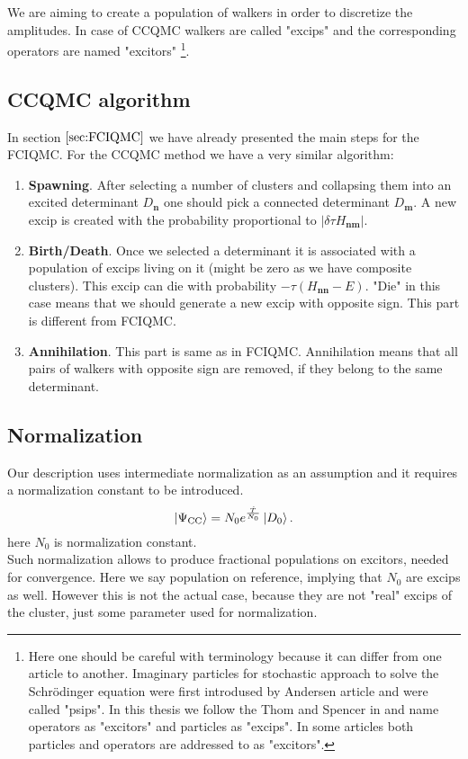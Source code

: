 \documentclass[twoside,english]{uiofysmaster}
\theoremstyle{definition}
\begin{document}
We are aiming to create a population of walkers in order to discretize the amplitudes. In case of CCQMC walkers are called "excips" and the corresponding operators are named "excitors" \footnote{Here one should be careful with terminology because it can differ from one article to another. Imaginary particles for stochastic approach to solve the Schr\"{o}dinger equation were first introdused by Andersen article  \cite{andersonRandomWalkSimulation1975} and were called "psips". In this thesis we follow the Thom and Spencer in \cite{spencerDevelopmentsStochasticCoupled2016}  and name operators as "excitors" and particles as "excips". In some articles both particles and operators are addressed to as "excitors".}.

\subsection{CCQMC algorithm}
In section $\ref{sec:FCIQMC}$ we have already presented the main steps for the FCIQMC. For the CCQMC method we have a very similar algorithm:
\begin{enumerate}
	\item \textbf{Spawning}. After selecting a number of clusters and collapsing them into an excited determinant $D_{\textbf{n}}$ one should pick a connected determinant   $D_{\textbf{m}}$. A new excip is created with the probability proportional to $|\delta \tau H_{\textbf{nm}}|$. 
	\item \textbf{Birth/Death}. Once we selected a determinant it is associated  with a population of excips living on it (might be zero as we have composite clusters). This excip can die with probability $- \tau (H_{\textbf{nn}} - E)$. "Die" in this case means that we should generate a new excip with opposite sign. This part is different from FCIQMC. 
	\item \textbf{Annihilation}. This part is same as in FCIQMC. Annihilation means that all pairs of walkers with opposite sign are removed, if they belong to the same determinant.
\end{enumerate}

\subsection{Normalization}
Our description uses intermediate normalization as an assumption and it requires a normalization constant to be introduced. 
\begin{equation}
\ket{\Psi_{\text{CC}}}=N_0 e^{\frac{\hat{T}}{N_0}} \ket{D_0}.
\end{equation}
here $N_0$ is normalization constant.\\
Such normalization allows to produce fractional populations on excitors, needed for convergence. Here we say population on reference, implying that $N_0$ are excips as well. However this is not the actual case, because they are not "real" excips of the cluster, just some parameter used for normalization.
\end{document}
